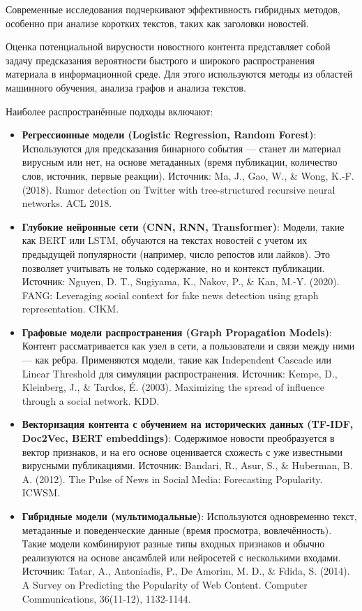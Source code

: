 Современные исследования подчеркивают эффективность гибридных методов, особенно при анализе коротких текстов, таких как заголовки новостей.

\label{subsubsec:anal114}
Оценка потенциальной вирусности новостного контента представляет собой задачу предсказания вероятности быстрого и широкого распространения материала в информационной среде. Для этого используются методы из областей машинного обучения, анализа графов и анализа текстов.

Наиболее распространённые подходы включают:
\begin{itemize}
    \item \textbf{Регрессионные модели (Logistic Regression, Random Forest)}: Используются для предсказания бинарного события — станет ли материал вирусным или нет, на основе метаданных (время публикации, количество слов, источник, первые реакции). Источник: Ma, J., Gao, W., \& Wong, K.-F. (2018). Rumor detection on Twitter with tree-structured recursive neural networks. ACL 2018.
    \item \textbf{Глубокие нейронные сети (CNN, RNN, Transformer)}: Модели, такие как BERT или LSTM, обучаются на текстах новостей с учетом их предыдущей популярности (например, число репостов или лайков). Это позволяет учитывать не только содержание, но и контекст публикации. Источник: Nguyen, D. T., Sugiyama, K., Nakov, P., \& Kan, M.-Y. (2020). FANG: Leveraging social context for fake news detection using graph representation. CIKM.
    \item \textbf{Графовые модели распространения (Graph Propagation Models)}: Контент рассматривается как узел в сети, а пользователи и связи между ними — как ребра. Применяются модели, такие как Independent Cascade или Linear Threshold для симуляции распространения. Источник: Kempe, D., Kleinberg, J., \& Tardos, É. (2003). Maximizing the spread of influence through a social network. KDD.
    \item \textbf{Векторизация контента с обучением на исторических данных (TF-IDF, Doc2Vec, BERT embeddings)}: Содержимое новости преобразуется в вектор признаков, и на его основе оценивается схожесть с уже известными вирусными публикациями. Источник: Bandari, R., Asur, S., \& Huberman, B. A. (2012). The Pulse of News in Social Media: Forecasting Popularity. ICWSM.
    \item \textbf{Гибридные модели (мультимодальные)}: Используются одновременно текст, метаданные и поведенческие данные (время просмотра, вовлечённость). Такие модели комбинируют разные типы входных признаков и обычно реализуются на основе ансамблей или нейросетей с несколькими входами. Источник: Tatar, A., Antoniadis, P., De Amorim, M. D., \& Fdida, S. (2014). A Survey on Predicting the Popularity of Web Content. Computer Communications, 36(11-12), 1132-1144.
\end{itemize}

